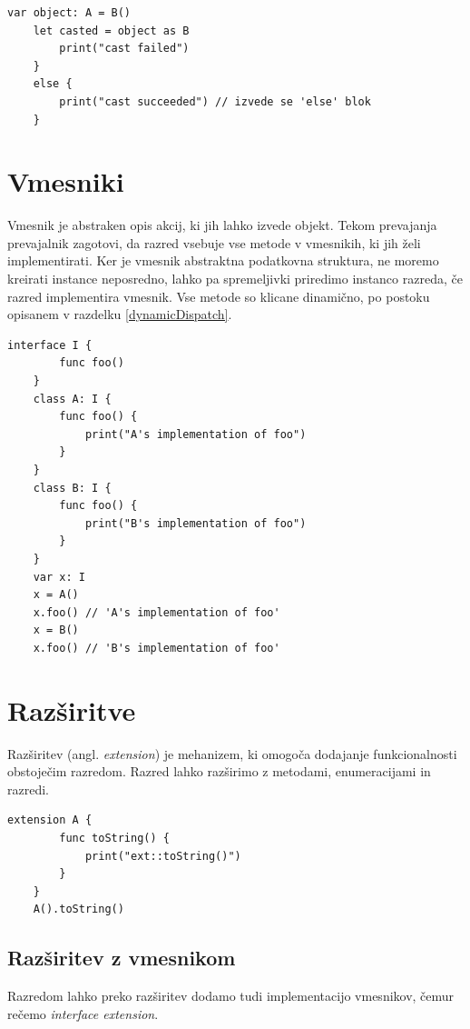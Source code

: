 \documentclass[a4paper, 12p]{book}
\begin{document}
\begin{lstlisting}[caption={Pretvorba za razrede iz sheme ~\ref{vtables}}, captionpos=b]
	var object: A = B()
	let casted = object as B
	    print("cast failed")
	}
	else {
	    print("cast succeeded") // izvede se 'else' blok
	}
\end{lstlisting}

\section{Vmesniki}

Vmesnik je abstraken opis akcij, ki jih lahko izvede objekt. Tekom prevajanja prevajalnik zagotovi, da razred vsebuje vse metode v vmesnikih, ki jih želi implementirati. Ker je vmesnik abstraktna podatkovna struktura, ne moremo kreirati instance neposredno, lahko pa spremeljivki priredimo instanco razreda, če razred implementira vmesnik. Vse metode so klicane dinamično, po postoku opisanem v razdelku \ref{dynamicDispatch}.

\begin{lstlisting}[caption={Vmesniki}, label={lst:interfaces}, captionpos=b]
	interface I {
	    func foo()
	}
	class A: I {
	    func foo() {
	        print("A's implementation of foo")
	    }
	}
	class B: I {
	    func foo() {
	        print("B's implementation of foo")
	    }
	}
	var x: I
	x = A()
	x.foo() // 'A's implementation of foo'
	x = B()
	x.foo() // 'B's implementation of foo'
\end{lstlisting}

\section{Razširitve}

Razširitev (angl. \textit{extension}) je mehanizem, ki omogoča dodajanje funkcionalnosti obstoječim razredom. Razred lahko razširimo z metodami, enumeracijami in razredi.  

\begin{lstlisting}[caption={Razširitev razreda A}, captionpos=b]
	extension A {
	    func toString() {
	        print("ext::toString()")
	    }
	}
	A().toString()
\end{lstlisting}


\subsection{Razširitev z vmesnikom}

Razredom lahko preko razširitev dodamo tudi implementacijo vmesnikov, čemur rečemo \textit{interface extension}.
\end{document}
